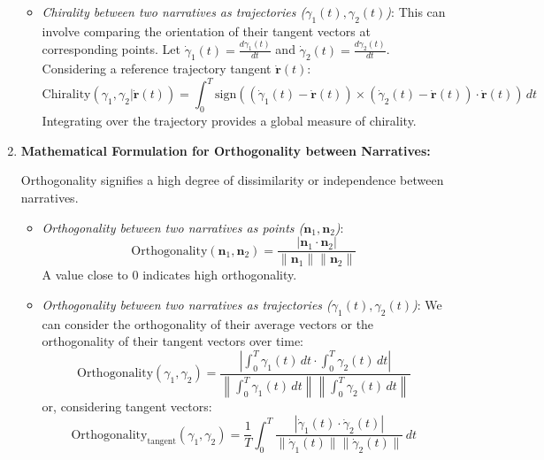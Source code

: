 \documentclass[12pt, a4paper]{article}
\begin{document}
\begin{enumerate}
\begin{itemize}
    \item \textit{Chirality between two narratives as trajectories ($\gamma_1(t), \gamma_2(t)$)}: This can involve comparing the orientation of their tangent vectors at corresponding points.  Let $\dot{\gamma}_1(t) = \frac{d\gamma_1(t)}{dt}$ and $\dot{\gamma}_2(t) = \frac{d\gamma_2(t)}{dt}$.  Considering a reference trajectory tangent $\dot{\mathbf{r}}(t)$:
    \begin{equation*}
        \text{Chirality}(\gamma_1, \gamma_2 | \dot{\mathbf{r}}(t)) = \int_0^T \text{sign}((\dot{\gamma}_1(t) - \dot{\mathbf{r}}(t)) \times (\dot{\gamma}_2(t) - \dot{\mathbf{r}}(t)) \cdot \dot{\mathbf{r}}(t)) \, dt
    \end{equation*}
    Integrating over the trajectory provides a global measure of chirality.
\end{itemize}

\item \textbf{Mathematical Formulation for Orthogonality between Narratives:}

Orthogonality signifies a high degree of dissimilarity or independence between narratives.

\begin{itemize}
    \item \textit{Orthogonality between two narratives as points ($\mathbf{n}_1, \mathbf{n}_2$)}:
    \begin{equation*}
        \text{Orthogonality}(\mathbf{n}_1, \mathbf{n}_2) = \frac{|\mathbf{n}_1 \cdot \mathbf{n}_2|}{\|\mathbf{n}_1\| \|\mathbf{n}_2\|}
    \end{equation*}
    A value close to 0 indicates high orthogonality.

    \item \textit{Orthogonality between two narratives as trajectories ($\gamma_1(t), \gamma_2(t)$)}:  We can consider the orthogonality of their average vectors or the orthogonality of their tangent vectors over time:
    \begin{equation*}
        \text{Orthogonality}(\gamma_1, \gamma_2) = \frac{\left| \int_0^T \gamma_1(t) \, dt \cdot \int_0^T \gamma_2(t) \, dt \right|}{\left\| \int_0^T \gamma_1(t) \, dt \right\| \left\| \int_0^T \gamma_2(t) \, dt \right\|}
    \end{equation*}
    or, considering tangent vectors:
    \begin{equation*}
        \text{Orthogonality}_{\text{tangent}}(\gamma_1, \gamma_2) = \frac{1}{T} \int_0^T \frac{|\dot{\gamma}_1(t) \cdot \dot{\gamma}_2(t)|}{\|\dot{\gamma}_1(t)\| \|\dot{\gamma}_2(t)\|} \, dt
    \end{equation*}
\end{itemize}


\end{enumerate}
\end{document}
